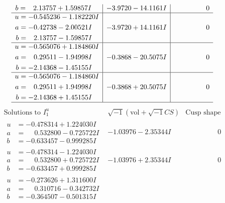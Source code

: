 \documentclass[1p]{elsarticle_modified}
\theoremstyle{definition}
\newcommand{\I}{\sqrt{-1}}
\begin{document}
$$\begin{array}{c|c|c}
\begin{aligned}
b &= \phantom{-}2.13757 + 1.59857 I\end{aligned}
 & -3.9720 - 14.1161 I & \phantom{-0.000000 } 0 \\ \hline\begin{aligned}
u &= -0.545236 - 1.182220 I \\
a &= -0.42738 - 2.00521 I \\
b &= \phantom{-}2.13757 - 1.59857 I\end{aligned}
 & -3.9720 + 14.1161 I & \phantom{-0.000000 } 0 \\ \hline\begin{aligned}
u &= -0.565076 + 1.184860 I \\
a &= \phantom{-}0.29511 - 1.94998 I \\
b &= -2.14368 - 1.45155 I\end{aligned}
 & -0.3868 - 20.5075 I & \phantom{-0.000000 } 0 \\ \hline\begin{aligned}
u &= -0.565076 - 1.184860 I \\
a &= \phantom{-}0.29511 + 1.94998 I \\
b &= -2.14368 + 1.45155 I\end{aligned}
 & -0.3868 + 20.5075 I & \phantom{-0.000000 } 0\\
 \hline 
 \end{array}$$\newpage$$\begin{array}{c|c|c}  
\text{Solutions to }I^u_{1}& \I (\text{vol} + \sqrt{-1}CS) & \text{Cusp shape}\\
 \hline 
\begin{aligned}
u &= -0.478314 + 1.224030 I \\
a &= \phantom{-}0.532800 - 0.725722 I \\
b &= -0.633457 - 0.999285 I\end{aligned}
 & -1.03976 - 2.35344 I & \phantom{-0.000000 } 0 \\ \hline\begin{aligned}
u &= -0.478314 - 1.224030 I \\
a &= \phantom{-}0.532800 + 0.725722 I \\
b &= -0.633457 + 0.999285 I\end{aligned}
 & -1.03976 + 2.35344 I & \phantom{-0.000000 } 0 \\ \hline\begin{aligned}
u &= -0.273626 + 1.311600 I \\
a &= \phantom{-}0.310716 - 0.342732 I \\
b &= -0.364507 - 0.501315 I\end{aligned}

\end{array}$$
\end{document}
